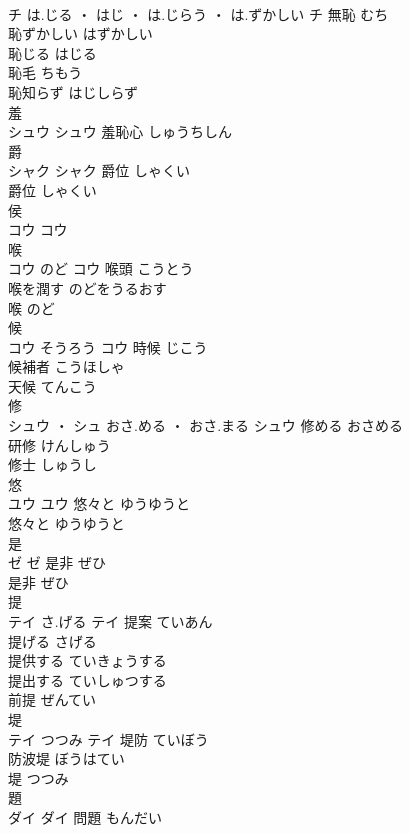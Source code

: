 \documentclass[8pt]{extreport}
\begin{document}
\begin{CJK}{UTF8}{min}
\\	チ	は.じる ・ はじ ・ は.じらう ・ は.ずかしい	チ	無恥	むち	
\\	恥ずかしい	はずかしい	
\\	恥じる	はじる	
\\	恥毛	ちもう	
\\	恥知らず	はじしらず	
\\	羞	
\\	シュウ		シュウ													羞恥心	しゅうちしん	
\\	爵	
\\	シャク		シャク	爵位	しゃくい	
\\	爵位	しゃくい	
\\	侯	
\\	コウ		コウ																																			
\\	喉	
\\	コウ	のど	コウ	喉頭	こうとう	
\\	喉を潤す	のどをうるおす	
\\	喉	のど	
\\	候	
\\	コウ	そうろう	コウ	時候	じこう	
\\	候補者	こうほしゃ	
\\	天候	てんこう	
\\	修	
\\	シュウ ・ シュ	おさ.める ・ おさ.まる	シュウ	修める	おさめる	
\\	研修	けんしゅう	
\\	修士	しゅうし	
\\	悠	
\\	ユウ		ユウ	悠々と	ゆうゆうと	
\\	悠々と	ゆうゆうと	
\\	是	
\\	ゼ		ゼ	是非	ぜひ	
\\	是非	ぜひ	
\\	提	
\\	テイ	さ.げる	テイ	提案	ていあん	
\\	提げる	さげる	
\\	提供する	ていきょうする	
\\	提出する	ていしゅつする	
\\	前提	ぜんてい	
\\	堤	
\\	テイ	つつみ	テイ	堤防	ていぼう	
\\	防波堤	ぼうはてい	
\\	堤	つつみ	
\\	題	
\\	ダイ		ダイ	問題	もんだい	

\end{CJK}
\end{document}
